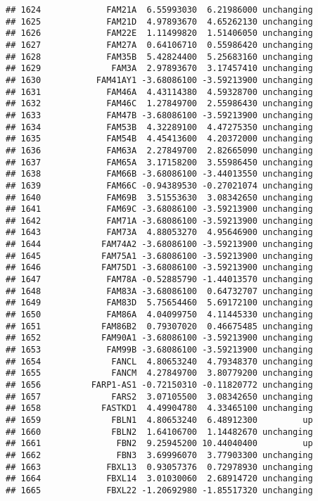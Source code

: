 \documentclass[]{article}
\begin{document}
\begin{verbatim}
## 1624             FAM21A  6.55993030  6.21986000 unchanging
## 1625             FAM21D  4.97893670  4.65262130 unchanging
## 1626             FAM22E  1.11499820  1.51406050 unchanging
## 1627             FAM27A  0.64106710  0.55986420 unchanging
## 1628             FAM35B  5.42824400  5.25683160 unchanging
## 1629              FAM3A  2.97893670  3.17457410 unchanging
## 1630           FAM41AY1 -3.68086100 -3.59213900 unchanging
## 1631             FAM46A  4.43114380  4.59328700 unchanging
## 1632             FAM46C  1.27849700  2.55986430 unchanging
## 1633             FAM47B -3.68086100 -3.59213900 unchanging
## 1634             FAM53B  4.32289100  4.47275350 unchanging
## 1635             FAM54B  4.45413600  4.20372000 unchanging
## 1636             FAM63A  2.27849700  2.82665090 unchanging
## 1637             FAM65A  3.17158200  3.55986450 unchanging
## 1638             FAM66B -3.68086100 -3.44013550 unchanging
## 1639             FAM66C -0.94389530 -0.27021074 unchanging
## 1640             FAM69B  3.51553630  3.08342650 unchanging
## 1641             FAM69C -3.68086100 -3.59213900 unchanging
## 1642             FAM71A -3.68086100 -3.59213900 unchanging
## 1643             FAM73A  4.88053270  4.95646900 unchanging
## 1644            FAM74A2 -3.68086100 -3.59213900 unchanging
## 1645            FAM75A1 -3.68086100 -3.59213900 unchanging
## 1646            FAM75D1 -3.68086100 -3.59213900 unchanging
## 1647             FAM78A -0.52885790 -1.44013570 unchanging
## 1648             FAM83A -3.68086100  0.64732707 unchanging
## 1649             FAM83D  5.75654460  5.69172100 unchanging
## 1650             FAM86A  4.04099750  4.11445330 unchanging
## 1651            FAM86B2  0.79307020  0.46675485 unchanging
## 1652            FAM90A1 -3.68086100 -3.59213900 unchanging
## 1653             FAM99B -3.68086100 -3.59213900 unchanging
## 1654              FANCL  4.80653240  4.79348370 unchanging
## 1655              FANCM  4.27849700  3.80779200 unchanging
## 1656          FARP1-AS1 -0.72150310 -0.11820772 unchanging
## 1657              FARS2  3.07105500  3.08342650 unchanging
## 1658            FASTKD1  4.49904780  4.33465100 unchanging
## 1659              FBLN1  4.80653240  6.48912300         up
## 1660              FBLN2  1.64106700  1.14482670 unchanging
## 1661               FBN2  9.25945200 10.44040400         up
## 1662               FBN3  3.69996070  3.77903300 unchanging
## 1663             FBXL13  0.93057376  0.72978930 unchanging
## 1664             FBXL14  3.01030060  2.68914720 unchanging
## 1665             FBXL22 -1.20692980 -1.85517320 unchanging

\end{verbatim}
\end{document}
